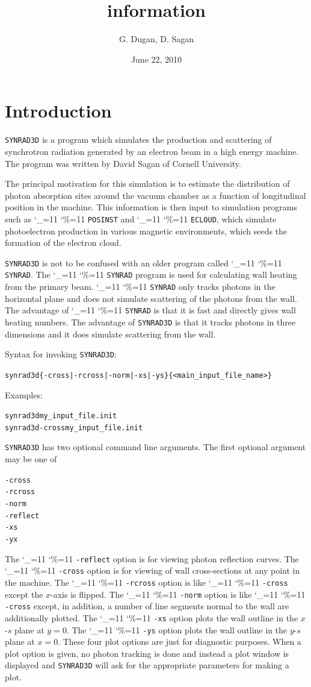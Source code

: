 \documentclass[11pt]{article}
\title{ \srthree information}
\author{G. Dugan, D. Sagan}
\date{June 22, 2010}
\newcommand{\srthree}{\texttt{SYNRAD3D}\xspace}
\newcommand\ttcmd{\begingroup\catcode`\_=11 \catcode`\%=11 \dottcmd}
\newcommand\dottcmd[1]{\texttt{#1}\endgroup}
\newcommand{\vn}{\ttcmd}
\newlength{\ExBeg}
\newlength{\ExEnd}
\newenvironment{example}
  {\vspace{\ExBeg} \begin{alltt}}
  {\end{alltt} \vspace{\ExEnd}}
\begin{document}
\maketitle

\section{Introduction} 

\srthree is a program which simulates
the production and scattering of synchrotron radiation generated by an
electron beam in a high energy machine. The program was written by David
Sagan of Cornell University.

The principal motivation for this simulation is to estimate the
distribution of photon absorption sites around the vacuum chamber as a
function of longitudinal position in the machine. This information is
then input to simulation programs such as \vn{POSINST} and
\vn{ECLOUD}, which simulate photoelectron production in various
magnetic environments, which seeds the formation of the electron
cloud.

\srthree is not to be confused with an older program called
\vn{SYNRAD}. The \vn{SYNRAD} program is used for calculating
wall heating from the primary beam.  \vn{SYNRAD} only tracks
photons in the horizontal plane and does not simulate scattering of
the photons from the wall. The advantage of \vn{SYNRAD} is that it
is fast and directly gives wall heating numbers. The advantage of
\srthree is that it tracks photons in three dimensions and it does
simulate scattering from the wall.

Syntax for invoking \srthree:
\begin{example}
  synrad3d \{-cross | -rcross | -norm | -xs | -ys\} \{<main_input_file_name>\}
\end{example}
Examples:
\begin{example}
  synrad3d my_input_file.init
  synrad3d -cross my_input_file.init
\end{example}

\srthree has two optional command line arguments. 
The first optional argument may be one of
\begin{example}
  -cross
  -rcross
  -norm
  -reflect
  -xs
  -yx
\end{example}
The \vn{-reflect} option is for viewing photon reflection curves.  The
\vn{-cross} option is for viewing of wall cross-sections at any point
in the machine. The \vn{-rcross} option is like \vn{-cross} except the
$x$-axis is flipped. The \vn{-norm} option is like \vn{-cross} except,
in addition, a number of line segments normal to the wall are
additionally plotted. The \vn{-xs} option plots the wall outline in
the $x$-$s$ plane at $y = 0$. The \vn{-ys} option plots the wall
outline in the $y$-$s$ plane at $x = 0$. These four plot options are
just for diagnostic purposes. When a plot option is given, no photon
tracking is done and instead a plot window is displayed and \srthree
will ask for the appropriate parameters for making a plot.
\end{document}
